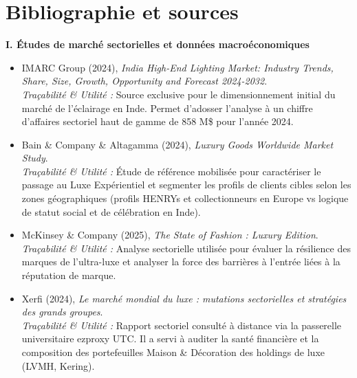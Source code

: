 \documentclass[11pt,a4paper]{article}
\begin{document}
\newpage
\section*{Bibliographie et sources}
\begingroup
\setlength{\parskip}{0.4em}

\textbf{I. Études de marché sectorielles et données macroéconomiques}
\begin{itemize}
  \item IMARC Group (2024), \textit{India High-End Lighting Market: Industry Trends, Share, Size, Growth, Opportunity and Forecast 2024-2032}. \\
  \textit{Traçabilité \& Utilité :} Source exclusive pour le dimensionnement initial du marché de l'éclairage en Inde. Permet d'adosser l'analyse à un chiffre d'affaires sectoriel haut de gamme de 858 M\$ pour l'année 2024.
  
  \item Bain \& Company \& Altagamma (2024), \textit{Luxury Goods Worldwide Market Study}. \\
  \textit{Traçabilité \& Utilité :} Étude de référence mobilisée pour caractériser le passage au \og Luxe Expérientiel \fg{} et segmenter les profils de clients cibles selon les zones géographiques (profils HENRYs et collectionneurs en Europe vs logique de statut social et de célébration en Inde).
  
  \item McKinsey \& Company (2025), \textit{The State of Fashion : Luxury Edition}. \\
  \textit{Traçabilité \& Utilité :} Analyse sectorielle utilisée pour évaluer la résilience des marques de l'ultra-luxe et analyser la force des barrières à l'entrée liées à la réputation de marque.
  
  \item Xerfi (2024), \textit{Le marché mondial du luxe : mutations sectorielles et stratégies des grands groupes}. \\
  \textit{Traçabilité \& Utilité :} Rapport sectoriel consulté à distance via la passerelle universitaire ezproxy UTC. Il a servi à auditer la santé financière et la composition des portefeuilles \og Maison \& Décoration \fg{} des holdings de luxe (LVMH, Kering).
  

\end{itemize}
\end{document}
